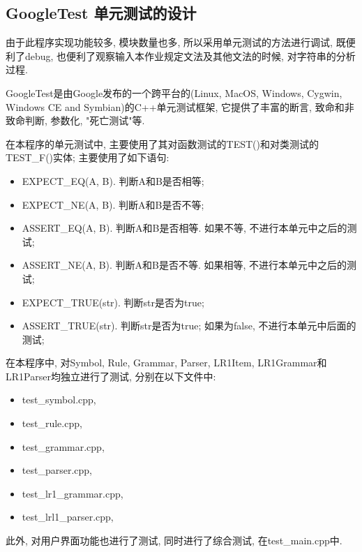 \subsection{GoogleTest 单元测试的设计}
由于此程序实现功能较多, 模块数量也多, 所以采用单元测试的方法进行调试,
既便利了debug, 也便利了观察输入本作业规定文法及其他文法的时候,
对字符串的分析过程.

GoogleTest是由Google发布的一个跨平台的(Linux, MacOS, Windows, Cygwin, Windows CE
and Symbian)的C++单元测试框架, 它提供了丰富的断言, 致命和非致命判断, 参数化,
"死亡测试"等.\par

在本程序的单元测试中, 主要使用了其对函数测试的TEST()和对类测试的TEST\_F()实体;
主要使用了如下语句:
\begin{itemize}
	\item EXPECT\_EQ(A, B). 判断A和B是否相等;
	\item EXPECT\_NE(A, B). 判断A和B是否不等;
	\item ASSERT\_EQ(A, B). 判断A和B是否相等. 如果不等, 不进行本单元中之后的测试;
	\item ASSERT\_NE(A, B). 判断A和B是否不等. 如果相等, 不进行本单元中之后的测试;
	\item EXPECT\_TRUE(str). 判断str是否为true;
	\item ASSERT\_TRUE(str). 判断str是否为true; 如果为false,
	      不进行本单元中后面的测试;
\end{itemize}

在本程序中, 对Symbol, Rule, Grammar, Parser, LR1Item,
LR1Grammar和LR1Parser均独立进行了测试, 分别在以下文件中:
\begin{itemize}
	\item test\_symbol.cpp,
	\item test\_rule.cpp,
	\item test\_grammar.cpp,
	\item test\_parser.cpp,
	\item test\_lr1\_grammar.cpp,
	\item test\_lrl1\_parser.cpp,
\end{itemize}
此外, 对用户界面功能也进行了测试, 同时进行了综合测试, 在test\_main.cpp中.

